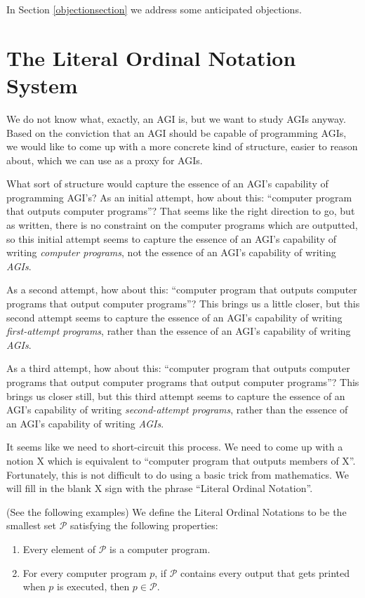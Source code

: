 \documentclass[runningheads]{llncs}
\begin{document}
In Section \ref{objectionsection} we address some anticipated objections.


\section{The Literal Ordinal Notation System}
\label{notationsystemsection}

We do not know what, exactly, an AGI is, but we want to study AGIs anyway.
Based on the conviction that an AGI should be capable of programming AGIs,
we would like to come up with a more concrete kind of structure, easier to reason
about, which we can use as a proxy for AGIs.

What sort of structure would capture the essence of an AGI's capability
of programming AGI's? As an initial attempt, how about this: ``computer
program that outputs computer programs''? That seems like the right direction
to go, but as written, there is no constraint on the computer programs which
are outputted, so this initial attempt seems to capture the essence of an
AGI's capability of writing \emph{computer programs}, not the essence of an
AGI's capability of writing \emph{AGIs}.

As a second attempt, how
about this: ``computer program that outputs computer programs that output
computer programs''? This brings us a little closer, but this second attempt
seems to capture the essence of an AGI's capability of writing \emph{first-attempt programs},
rather than the essence of an AGI's capability of writing \emph{AGIs}.

As a third attempt, how about this:
``computer program that outputs computer programs that output computer programs
that output computer programs''? This brings us closer still, but this third
attempt seems to capture the essence of an AGI's capability of writing
\emph{second-attempt programs}, rather than the essence of an AGI's capability of
writing \emph{AGIs}.

It seems like we need to short-circuit this process. We need to come up with a notion
X which is equivalent to ``computer program that outputs members of X''.
Fortunately, this is not difficult to do using a basic trick from mathematics.
We will fill in the blank X sign with the phrase ``Literal Ordinal Notation''.

\begin{definition}
\label{literalnotationdef}
    (See the following examples)
    We define the Literal Ordinal Notations to be the smallest set $\mathcal P$
    satisfying the following properties:
    \begin{enumerate}
        \item
            Every element of $\mathcal P$ is a computer program.
        \item
            For every computer program $p$,
            if $\mathcal P$ contains every output that gets printed when $p$ is executed,
            then $p\in\mathcal P$.
    \end{enumerate}
\end{definition}
\end{document}
